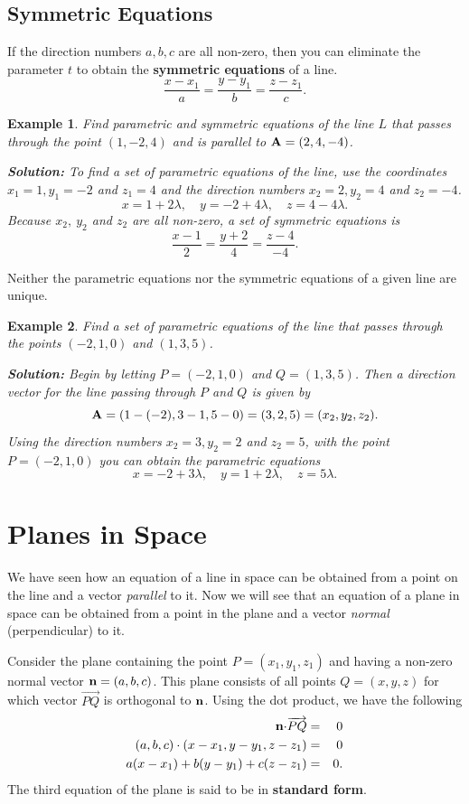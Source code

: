 \documentclass[titlepage,a4paper,12pt]{report}
\newtheorem{example}{Example}[section]
\begin{document}
\subsection{Symmetric Equations}
If the direction numbers $a,b,c$ are all non-zero, then you can eliminate the parameter $t$ to obtain the \textbf{symmetric equations} of a line.
\[\dfrac{x-x_1}{a}=\dfrac{y-y_1}{b}=\dfrac{z-z_1}{c}.\]
\begin{example}
Find parametric and symmetric equations of the line $L$ that passes through  the point $(1,-2,4)$ and is parallel to ${\bf{A}}=(2,4,-4)$.

\noindent \textbf{Solution:} To find a set of parametric equations of the line, use the coordinates $x_1=1, y_1=-2$ and $z_1=4$ and the direction numbers $x_2=2, y_2=4$ and $z_2=-4$.
\[x=1+2\lambda, \quad y=-2+4\lambda, \quad z=4-4\lambda.\]
Because $x_2,~y_2$ and $z_2$ are all non-zero, a set of symmetric equations is 
\[\dfrac{x-1}{2}=\dfrac{y+2}{4}=\dfrac{z-4}{-4}.\]
\end{example}
\noindent Neither the parametric equations nor the symmetric equations of a given line are unique. 
\begin{example}
Find a set of parametric equations of the line that passes through the points $(-2,1,0)$ and $(1,3,5)$. 

\noindent \textbf{Solution:} Begin by letting $P=(-2,1,0)$ and $Q=(1,3,5)$. Then a direction vector for the line passing through $P$ and $Q$ is given by 
\[{\bf{A}}=(1-(-2), 3-1, 5-0)=(3,2,5)=(x_2,y_2,z_2).\]
Using the direction numbers $x_2=3, y_2=2$ and $z_2=5$, with the point $P=(-2,1,0)$ you can obtain the parametric equations 
\[x=-2+3\lambda, \quad y=1+2\lambda, \quad z=5\lambda.\]
\end{example}
\section{Planes in Space}
We have seen how an equation of a line in space can be obtained from a point on the line and a vector \textit{parallel} to it. Now we will see that an equation of a plane in space can be obtained from a point in the plane and a vector \textit{normal} (perpendicular) to it.

\noindent Consider the plane containing the point $P=(x_1,y_1,z_1)$ and having a non-zero normal vector ${\bf{n}}=(a,b,c)$. This plane consists of all points $Q=(x,y,z)$ for which vector $\overrightarrow{PQ}$ is orthogonal to ${\bf{n}}$. Using the dot product, we have the following 
\begin{eqnarray*}
{\bf{n}\cdot}\overrightarrow{PQ} &=& 0\\
(a,b,c)\cdot (x-x_1,y-y_1,z-z_1) &=& 0\\
a(x-x_1)+b(y-y_1)+c(z-z_1) &=& 0.
\end{eqnarray*} 
The third equation of the plane is said to be in \textbf{standard form}.
\end{document}
